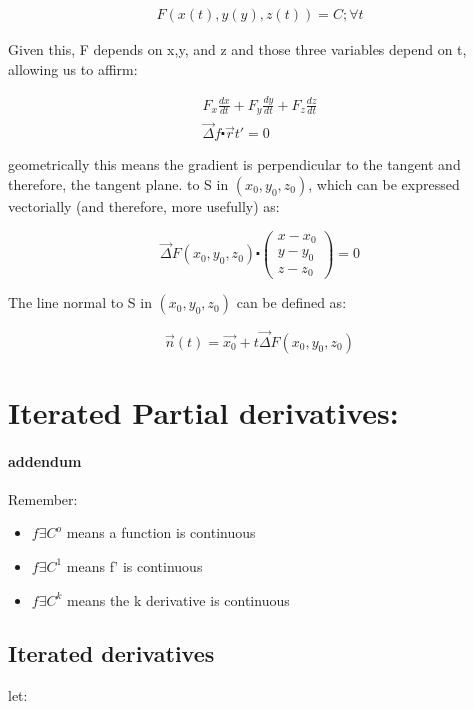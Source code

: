 \documentclass[11pt,fleqn]{book} %
\begin{document}
\begin{gather}
    F(x(t), y(y), z(t)) = C ; \forall t
\end{gather}

Given this, F depends on x,y, and z and those three variables depend on t, allowing us
to affirm:

\begin{gather}
    F_x \frac{dx}{dt} + F_y \frac{dy}{dt} + F_z \frac{dz}{dt} \\
    \vec{\Delta} f \centerdot \vec{r}t' = 0
\end{gather}

geometrically this means the gradient is perpendicular to the tangent and therefore, the tangent plane.
to S in $(x_0,y_0,z_0)$, which can be expressed vectorially (and therefore, more usefully) as:

\begin{equation}
    \vec{\Delta}F(x_0,y_0,z_0) \centerdot \begin{pmatrix}
        x - x_0 \\ 
        y - y_0 \\ 
        z - z_0
    \end{pmatrix} = 0
\end{equation}

The line normal to S in $(x_0,y_0,z_0)$ can be defined as:

\begin{equation}
    \vec{n}(t) = \vec{x_0} + t\vec{\Delta} F(x_0,y_0,z_0)
\end{equation}

\section{Iterated Partial derivatives:}

\paragraph*{addendum}

Remember:
\begin{itemize}
    \item $f \exists C^o$ means a function is continuous
    \item $f \exists C^1$ means f' is continuous
    \item $f \exists C^k$ means the k derivative is continuous
\end{itemize}

\subsection{Iterated derivatives}
let:
\end{document}
